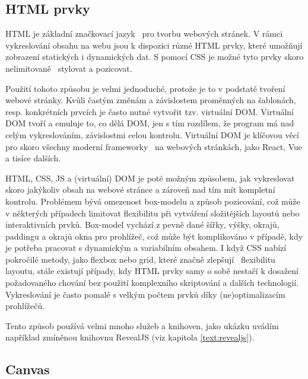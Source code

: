 \subsection{HTML prvky}\label{text:vykreslovani/html}

HTML je základní značkovací jazyk~\cite{uzayr2022frontend} pro tvorbu webových stránek. 
V rámci vykreslování obsahu na webu jsou k dispozici různé HTML prvky, které umožňují zobrazení statických i dynamických dat.
S pomocí CSS je možné tyto prvky skoro nelimitovaně~\cite{uzayr2022frontend} stylovat a pozicovat.

Použití tohoto způsobu je velmi jednoduché, protože je to v podstatě tvoření webové stránky.
Kvůli častým změnám a závislostem proměnných na šablonách, resp. konkrétních prvcích je často nutné vytvořit tzv. virtuální DOM.
Virtuální DOM tvoří a emuluje to, co dělá DOM, jen s tím rozdílem, že program má nad celým vykreslováním, závislostmi celou kontrolu.
Virtuální DOM je klíčovou věcí pro skoro všechny moderní frameworky~\cite{uzayr2022frontend} na webových stránkách, jako React, Vue a tisíce dalších.

HTML, CSS, JS a (virtuální) DOM je poté možným způsobem, jak vykreslovat skoro jakýkoliv obsah na webové stránce a zároveň nad tím mít kompletní kontrolu.
Problémem bývá omezenost box-modelu a způsob pozicování, což může v některých případech limitovat flexibilitu při vytváření složitějších layoutů nebo interaktivních prvků. Box-model vychází z pevně dané šířky, výšky, okrajů, paddingu a okrajů okna pro prohlížeč, což může být komplikováno v případě, kdy je potřeba pracovat s dynamickým a variabilním obsahem. 
I když CSS nabízí pokročilé metody, jako flexbox nebo grid, které značně zlepšují~\cite{uzayr2022frontend} flexibilitu layoutu, stále existují případy, kdy HTML prvky samy o sobě nestačí k dosažení požadovaného chování bez použití komplexního skriptování a dalších technologií.
Vykreslování je často pomalé s velkým počtem prvků díky (ne)optimalizacím prohlížečů.

Tento způsob používá velmi mnoho služeb a knihoven, jako ukázku uvádím například zmíněnou knihovnu RevealJS (viz kapitola \ref{text:revealjs}).

\subsection{Canvas}

